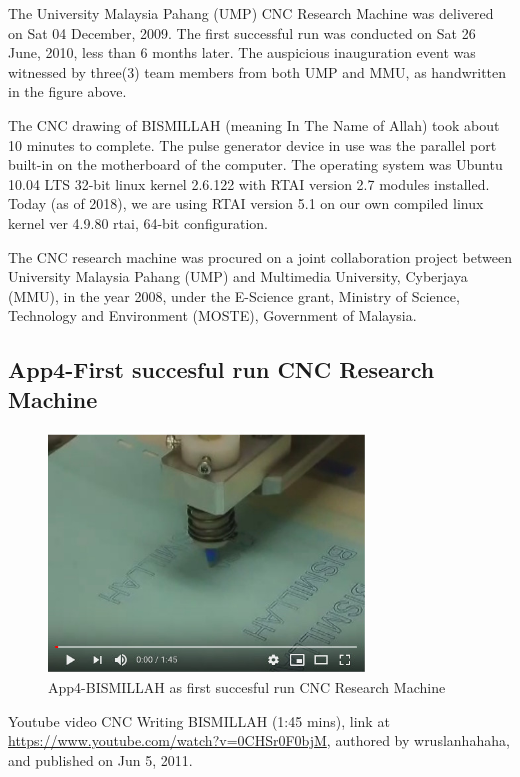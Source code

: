 The University Malaysia Pahang (UMP) CNC Research Machine was delivered on Sat 04 December, 2009. The first successful run was conducted on Sat 26 June, 2010, less than 6 months later. The auspicious inauguration event was witnessed by three(3) team members from both UMP and MMU, as handwritten in the figure above. 
\vspace*{1\baselineskip}

The CNC drawing of BISMILLAH (meaning In The Name of Allah) took about 10 minutes to complete. The pulse generator device in use was the parallel port built-in on the motherboard of the computer. The operating system was Ubuntu 10.04 LTS 32-bit linux kernel 2.6.122 with RTAI version 2.7 modules installed. Today (as of 2018), we are using RTAI version 5.1 on our own compiled linux kernel ver 4.9.80 rtai, 64-bit configuration. 
\vspace*{1\baselineskip}

The CNC research machine was procured on a joint collaboration project between University Malaysia Pahang (UMP) and Multimedia University, Cyberjaya (MMU), in the year 2008, under the E-Science grant, Ministry of Science, Technology and Environment (MOSTE), Government of Malaysia.  

\pagebreak
\subsection{App4-First succesful run CNC Research Machine}

\begin{figure}[htbp]
	\begin{center}
		\includegraphics[width=0.75\textwidth]{./07-images/img-Ch4App/Youtube-BISMILLAH-First-Run.jpg}
		\caption{App4-BISMILLAH as first succesful run CNC Research Machine}
		\label{fig:App4-Youtube-BISMILLAH-First-Run.jpg}
	\end{center}
\end{figure}
Youtube video CNC Writing BISMILLAH (1:45 mins), link at \url{https://www.youtube.com/watch?v=0CHSr0F0bjM}, authored by wruslanhahaha, and published on Jun 5, 2011.

